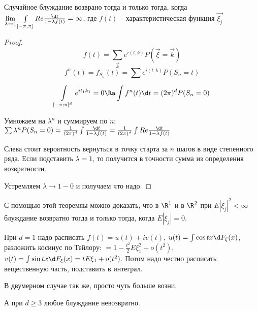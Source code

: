\begin{theorem}

Случайное блуждание возврано тогда и только тогда, когда $\lim\limits_{\lambda \to 1} \int\limits_{[-\pi, \pi]} Re \frac{\d t}{1 - \lambda f(t)} = \infty$,
где $f(t)$ -- характеристическая функция $\overrightarrow{\xi_j}$
\end{theorem}
\begin{proof}
$$f(t) = \sum\limits_{\overrightarrow{k}} e^{i (t, k)} P(\overrightarrow{\xi} = \overrightarrow{k})$$
$$f^n(t) = f_{S_n}(t) = \sum e^{i (t, k)} P(S_n = t)$$

$$\int\limits_{[-\pi; \pi]^d} e^{i t_1 k_1} = 0 \Ra \int f^n(t) \d t = (2\pi)^d P(S_n = 0)$$

Умножаем на $\lambda^n$ и суммируем по $n$: $\sum \lambda^n P(S_n = 0) = \frac{1}{(2\pi)^d} \int \frac{\d t}{1 - \lambda f(t)} = \frac{1}{(2\pi)^d} \int Re \frac{\d t}{1 - \lambda f(t)}$

Слева стоит вероятность вернуться в точку старта за $n$ шагов в виде степенного ряда. Если подставить $\lambda = 1$, то получится в точности сумма из определения возвратности.

Устремляем $\lambda \to 1 - 0$ и получаем что надо.
\end{proof}
\begin{Rem}
С помощью этой теоремяы можно доказать, что в $\R^1$ и в $\R^2$ при $E |\xi_j|^2 < \infty$ блуждание возвратно тогда и только тогда, когда $E |\xi_j| = 0$.

При $d=1$ надо расписать $f(t) = u(t) + iv(t)$, $u(t) = \int \cos tx \d F_\xi(x)$, разложить косинус по Тейлору: $= 1 - \frac{t^2}{2} E\xi_1^2 + o(t^2)$,
$v(t) = \int \sin tx \d F_\xi(x) = t E\xi_1 + o(t^2)$. Потом надо честно расписать вещественную часть, подставить в интеграл.

В двумерном случае так же, просто чуть больше возни.

А при $d \geq 3$ любое блуждание невозвратно.
\end{Rem}

